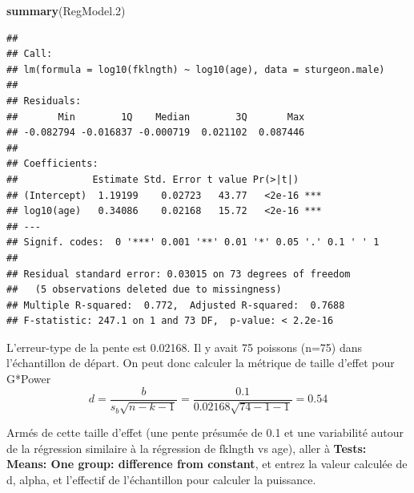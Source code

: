 \documentclass[
  12pt,
]{book}
\newenvironment{Shaded}{\begin{snugshade}}{\end{snugshade}}
\newcommand{\FloatTok}[1]{\textcolor[rgb]{0.00,0.00,0.81}{#1}}
\newcommand{\KeywordTok}[1]{\textcolor[rgb]{0.13,0.29,0.53}{\textbf{#1}}}
\newcommand{\NormalTok}[1]{#1}
\begin{document}
\begin{Shaded}
\begin{Highlighting}[]
\KeywordTok{summary}\NormalTok{(RegModel}\FloatTok{.2}\NormalTok{)}
\end{Highlighting}
\end{Shaded}

\begin{verbatim}
## 
## Call:
## lm(formula = log10(fklngth) ~ log10(age), data = sturgeon.male)
## 
## Residuals:
##       Min        1Q    Median        3Q       Max 
## -0.082794 -0.016837 -0.000719  0.021102  0.087446 
## 
## Coefficients:
##             Estimate Std. Error t value Pr(>|t|)    
## (Intercept)  1.19199    0.02723   43.77   <2e-16 ***
## log10(age)   0.34086    0.02168   15.72   <2e-16 ***
## ---
## Signif. codes:  0 '***' 0.001 '**' 0.01 '*' 0.05 '.' 0.1 ' ' 1
## 
## Residual standard error: 0.03015 on 73 degrees of freedom
##   (5 observations deleted due to missingness)
## Multiple R-squared:  0.772,  Adjusted R-squared:  0.7688 
## F-statistic: 247.1 on 1 and 73 DF,  p-value: < 2.2e-16
\end{verbatim}

L'erreur-type de la pente est 0.02168. Il y avait 75 poissons (n=75) dans l'échantillon de départ. On peut donc calculer la métrique de taille d'effet pour G*Power
\[ d = \frac{b}{s_b\sqrt{n-k-1}} = \frac{0.1}{0.02168\sqrt{74-1-1}}=0.54\]

Armés de cette taille d'effet (une pente présumée de 0.1 et une variabilité autour de la régression similaire à la régression de fklngth vs age), aller à \textbf{Tests: Means: One group: difference from constant}, et entrez la valeur calculée de d, alpha, et l'effectif de l'échantillon pour calculer la puissance.
\end{document}
